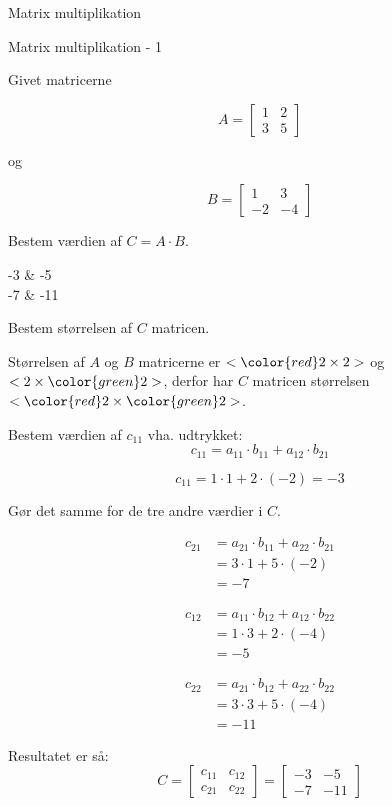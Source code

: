 \documentclass{article}
\begin{document}
Matrix multiplikation
\tableofcontents
\newpage

\begin{exercise}{Matrix multiplikation - 1}

Givet matricerne 

\[
A = \left[\begin{array}{rr}
1 & 2 \\ 
3 & 5 
\end{array} \right]
\]

og 

\[
B = \left[\begin{array}{rr}
1 & 3 \\ 
-2 & -4 
\end{array} \right]
\]

Bestem værdien af $C = A \cdot B$.

\begin{answermatrix}
-3 & -5  \\
-7 & -11 
\end{answermatrix}

\hint
Bestem størrelsen af $C$ matricen.

\hint
Størrelsen af $A$ og $B$ matricerne er $<{\color{red} 2} \times 2>$ og $<2 \times {\color{green}2}>$, 
derfor har $C$ matricen størrelsen $<{\color{red} 2} \times {\color{green}2}>$.

\hint
Bestem værdien af $c_{11}$ vha. udtrykket:
\[
c_{11} = a_{11} \cdot b_{11} + a_{12} \cdot b_{21}
\]

\hint
\[
c_{11} = 1 \cdot 1 + 2 \cdot (-2) = -3
\]

\hint
Gør det samme for de tre andre værdier i $C$.

\hint
\begin{align*}
c_{21} & = a_{21} \cdot b_{11} + a_{22} \cdot b_{21} \\
& = 3 \cdot 1 + 5 \cdot (-2) \\
& = -7
\end{align*}

\hint
\begin{align*}
c_{12} & = a_{11} \cdot b_{12} + a_{12} \cdot b_{22} \\
& = 1 \cdot 3 + 2 \cdot (-4) \\
& = -5
\end{align*}

\hint
\begin{align*}
c_{22} & = a_{21} \cdot b_{12} + a_{22} \cdot b_{22} \\
& = 3 \cdot 3 + 5 \cdot (-4) \\
& = -11
\end{align*}


\hint
Resultatet er så:
\[
C = \left[\begin{array}{rr}
c_{11} & c_{12} \\
c_{21} & c_{22} 
\end{array} \right] = 
\left[\begin{array}{rr}
-3 & -5 \\
-7 & -11 
\end{array} \right]
\]


\end{exercise}
\end{document}
